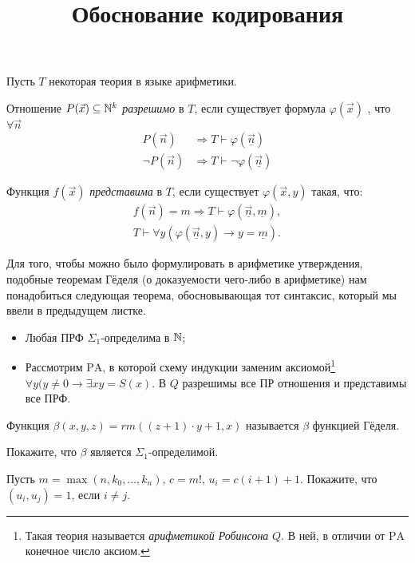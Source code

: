 \documentclass[a4paper, 12pt, num=Г4]{listok}
\renewcommand{\phi}{\varphi}
\begin{document}
\title{Обоснование кодирования}
\maketitle
Пусть $T$ некоторая теория в языке арифметики.
\begin{definition}
	Отношение $P(\vec{x}) \subseteq \mathbb{N}^k$ \textit{разрешимо} в $T$,
	если существует формула $\phi(\vec x)$ , что $\forall{\vec n}$
	\begin{align*}
		P(\vec n) & \Rightarrow T \vdash \phi(\underline{\vec n}) \\
		\neg P(\vec n) & \Rightarrow T \vdash \neg \phi(\underline{\vec n })
	\end{align*}
\end{definition}
\begin{definition}
	Функция $f(\vec x )$ \textit{представима} в $T$, если существует $\phi (\vec x , y)$ такая, что:
	\begin{gather*}
		f(\vec n) = m \Rightarrow T \vdash \phi(\underline{\vec n}, \underline{m}),\\
		T \vdash \forall y (\phi(\underline{\vec n}, y) \to y = \underline{m}).
	\end{gather*}
\end{definition}
Для того, чтобы можно было формулировать в арифметике утверждения, подобные теоремам Гёделя (о доказуемости чего-либо в арифметике)
нам понадобиться следующая теорема, обосновывающая тот синтаксис, который мы ввели в предыдущем листке.
\begin{theorem}[Обоснования]
	\begin{itemize}
		\item Любая ПРФ $\Sigma_1$-определима в $\mathbb{N}$;
		\item Рассмотрим $\mathrm{PA}$, в которой схему индукции заменим аксиомой\footnote{Такая
			теория называется \textit{арифметикой Робинсона} $Q$.
			В ней, в отличии от $\mathrm{PA}$ конечное число аксиом.} $\forall y (y \ne 0 \to \exists x y = S(x)$.
			В $Q$ разрешимы все ПР отношения и представимы все ПРФ.
	\end{itemize}
\end{theorem}
\begin{definition}
	Функция $\beta(x, y, z) = rm((z + 1) \cdot y + 1, x)$ называется $\beta$ функцией Гёделя.
\end{definition}
\begin{problem}
	Покажите, что $\beta$ является $\Sigma_1$-определимой.
\end{problem}
\begin{problem}
	Пусть $m = \max(n, k_0, \dots, k_n)$, $c = m!$, $u_i = c(i + 1) + 1$.
	Покажите, что $(u_i, u_j) = 1$, если $i \ne j$.
\end{problem}
\end{document}
